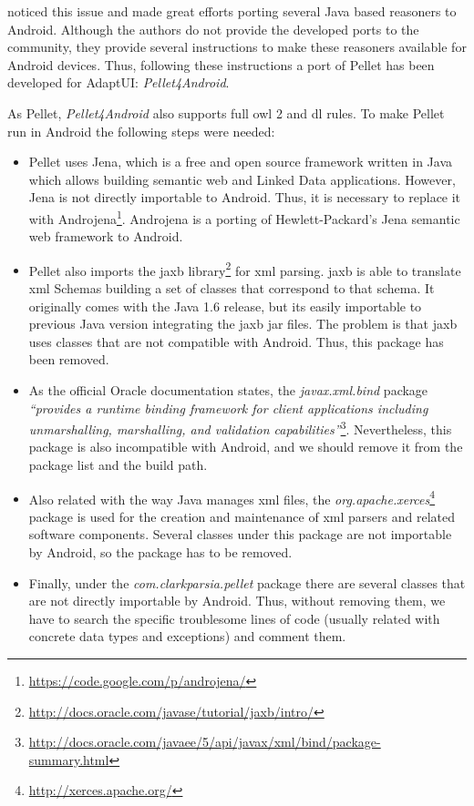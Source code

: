 \citet{yus_android_2013} noticed this issue and made great efforts porting
several Java based reasoners to Android. Although the authors do not provide the
developed ports to the community, they provide several instructions to make these
reasoners available for Android devices. Thus, following these instructions a port
of Pellet has been developed for AdaptUI: \textit{Pellet4Android}.

As Pellet, \textit{Pellet4Android} also supports full \ac{owl} 2 and \ac{dl} 
rules. To make Pellet run in Android the following steps were needed:

\begin{itemize}
  \item Pellet uses Jena, which is a free and open source framework written in
  Java which allows building semantic web and Linked Data applications. However,
  Jena is not directly importable to Android. Thus, it is necessary to replace it
  with Androjena\footnote{\url{https://code.google.com/p/androjena/}}. Androjena
  is a porting of Hewlett-Packard's Jena semantic web framework to Android. 
  
  \item Pellet also imports the \ac{jaxb} library\footnote{\url{http://docs.oracle.com/javase/tutorial/jaxb/intro/}} for \ac{xml} 
  parsing. \ac{jaxb} is able to translate \ac{xml} Schemas building a set of 
  classes that correspond to that schema. It originally comes with the Java 1.6 
  release, but its easily importable to previous Java version integrating the 
  \ac{jaxb} jar files. The problem is that \ac{jaxb} uses classes that are not 
  compatible with Android. Thus, this package has been removed. 
  
  \item As the official Oracle documentation states, the \textit{javax.xml.bind}
  package \textit{``provides a runtime binding framework for client applications
  including unmarshalling, marshalling, and validation capabilities''}\footnote{\url{http://docs.oracle.com/javaee/5/api/javax/xml/bind/package-summary.html}}.
  Nevertheless, this package is also incompatible with Android, and we should
  remove it from the package list and the build path.
  
  \item Also related with the way Java manages \ac{xml} files, the 
  \textit{org.apache.xerces}\footnote{\url{http://xerces.apache.org/}} package
  is used for the creation and maintenance of \ac{xml} parsers and related
  software components. Several classes under this package are not importable by
  Android, so the package has to be removed.
  
  \item Finally, under the \textit{com.clarkparsia.pellet} package there are several
  classes that are not directly importable by Android. Thus, without removing them,
  we have to search the specific troublesome lines of code (usually related with
  concrete data types and exceptions) and comment them. 
\end{itemize}

